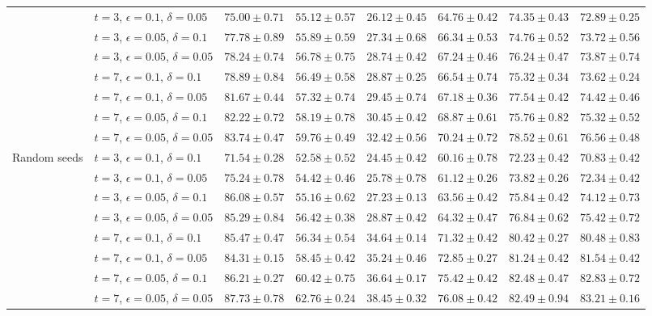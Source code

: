 \documentclass[journal]{IEEEtran}
\theoremstyle{definition}
\begin{document}
\begin{table*}[!t]
\begin{center}
{\begin{tabular}{|l|l|c|c|c|c|c|c|}
 & $t=3$, $\epsilon=0.1$, $\delta=0.05$ & $75.00 \pm 0.71$ & $55.12 \pm 0.57$ & $26.12 \pm 0.45$ & $64.76 \pm 0.42$ & $74.35 \pm 0.43$ & $72.89 \pm 0.25$ \\
 & $t=3$, $\epsilon=0.05$, $\delta=0.1$ & $77.78 \pm 0.89$ & $55.89 \pm 0.59$ & $27.34 \pm 0.68$ & $66.34 \pm 0.53$ & $74.76 \pm 0.52$ & $73.72 \pm 0.56$ \\
 & $t=3$, $\epsilon=0.05$, $\delta=0.05$ & $78.24 \pm 0.74$ & $56.78 \pm 0.75$ & $28.74 \pm 0.42$ & $67.24 \pm 0.46$ & $76.24 \pm 0.47$ & $73.87 \pm 0.74$ \\
\cline{2-8}
 & $t=7$, $\epsilon=0.1$, $\delta=0.1$ & $78.89 \pm 0.84$ & $56.49 \pm 0.58$ & $28.87 \pm 0.25$ & $66.54 \pm 0.74$ & $75.32 \pm 0.34$ & $73.62 \pm 0.24$ \\
 & $t=7$, $\epsilon=0.1$, $\delta=0.05$ & $81.67 \pm 0.44$ & $57.32 \pm 0.74$ & $29.45 \pm 0.74$ & $67.18 \pm 0.36$ & $77.54 \pm 0.42$ & $74.42 \pm 0.46$ \\
 & $t=7$, $\epsilon=0.05$, $\delta=0.1$ & $82.22 \pm 0.72$ & $58.19 \pm 0.78$ & $30.45 \pm 0.42$ & $68.87 \pm 0.61$ & $75.76 \pm 0.82$ & $75.32 \pm 0.52$ \\
 & $t=7$, $\epsilon=0.05$, $\delta=0.05$ & $83.74 \pm 0.47$ & $59.76 \pm 0.49$ & $32.42 \pm 0.56$ & $70.24 \pm 0.72$ & $78.52 \pm 0.61$ & $76.56 \pm 0.48$ \\
\hline
\multirow{8}{*}{Random seeds} & $t=3$, $\epsilon=0.1$, $\delta=0.1$   & $71.54 \pm 0.28$ & $52.58 \pm 0.52$ & $24.45 \pm 0.42$ & $60.16 \pm 0.78$ & $72.23 \pm 0.42$ & $70.83 \pm 0.42$ \\
 & $t=3$, $\epsilon=0.1$, $\delta=0.05$  & $75.24 \pm 0.78$ & $54.42 \pm 0.46$ & $25.78 \pm 0.78$ & $61.12 \pm 0.26$ & $73.82 \pm 0.26$ & $72.34 \pm 0.42$ \\
 & $t=3$, $\epsilon=0.05$, $\delta=0.1$  & $86.08 \pm 0.57$ & $55.16 \pm 0.62$ & $27.23 \pm 0.13$ & $63.56 \pm 0.42$ & $75.84 \pm 0.42$ & $74.12 \pm 0.73$ \\
 & $t=3$, $\epsilon=0.05$, $\delta=0.05$ & $85.29 \pm 0.84$ & $56.42 \pm 0.38$ & $28.87 \pm 0.42$ & $64.32 \pm 0.47$ & $76.84 \pm 0.62$ & $75.42 \pm 0.72$ \\
\cline{2-8}
 & $t=7$, $\epsilon=0.1$, $\delta=0.1$   & $85.47 \pm 0.47$ & $56.34 \pm 0.54$ & $34.64 \pm 0.14$ & $71.32 \pm 0.42$ & $80.42 \pm 0.27$ & $80.48 \pm 0.83$ \\
 & $t=7$, $\epsilon=0.1$, $\delta=0.05$  & $84.31 \pm 0.15$ & $58.45 \pm 0.42$ & $35.24 \pm 0.46$ & $72.85 \pm 0.27$ & $81.24 \pm 0.42$ & $81.54 \pm 0.42$ \\
 & $t=7$, $\epsilon=0.05$, $\delta=0.1$  & $86.21 \pm 0.27$ & $60.42 \pm 0.75$ & $36.64 \pm 0.17$ & $75.42 \pm 0.42$ & $82.48 \pm 0.47$ & $82.83 \pm 0.72$ \\
 & $t=7$, $\epsilon=0.05$, $\delta=0.05$ & $87.73 \pm 0.78$ & $62.76 \pm 0.24$ & $38.45 \pm 0.32$ & $76.08 \pm 0.42$ & $82.49 \pm 0.94$ & $83.21 \pm 0.16$ \\
\hline
\end{tabular}
}
\end{center}
\end{table*}
\end{document}
